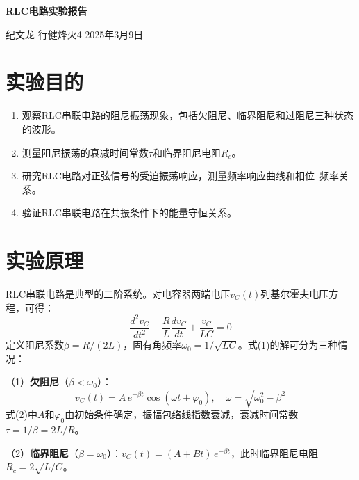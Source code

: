 \documentclass[12pt, a4paper]{article}
\begin{document}
\begin{center}
{\LARGE \textbf{RLC电路实验报告}}
\end{center}

\begin{flushright}
纪文龙 \quad 行健烽火4  \quad 2025年3月9日
\end{flushright}

\vspace{0.5cm}

\section*{实验目的}

\begin{enumerate}[label=\arabic*、]
    \item 观察RLC串联电路的阻尼振荡现象，包括欠阻尼、临界阻尼和过阻尼三种状态的波形。
    \item 测量阻尼振荡的衰减时间常数$\tau$和临界阻尼电阻$R_c$。
    \item 研究RLC电路对正弦信号的受迫振荡响应，测量频率响应曲线和相位--频率关系。
    \item 验证RLC串联电路在共振条件下的能量守恒关系。
\end{enumerate}

\section*{实验原理}

RLC串联电路是典型的二阶系统。对电容器两端电压$v_C(t)$列基尔霍夫电压方程，可得：
\begin{equation}
    \frac{d^2 v_C}{dt^2} + \frac{R}{L}\frac{dv_C}{dt} + \frac{v_C}{LC} = 0
\end{equation}
定义阻尼系数$\beta = R/(2L)$，固有角频率$\omega_0 = 1/\sqrt{LC}$。式(1)的解可分为三种情况：

（1）\textbf{欠阻尼}（$\beta < \omega_0$）：
\begin{equation}
    v_C(t) = A\,e^{-\beta t}\cos(\omega t + \varphi_0), \quad \omega = \sqrt{\omega_0^2 - \beta^2}
\end{equation}
式(2)中$A$和$\varphi_0$由初始条件确定，振幅包络线指数衰减，衰减时间常数$\tau = 1/\beta = 2L/R$。

（2）\textbf{临界阻尼}（$\beta = \omega_0$）：$v_C(t) = (A + Bt)\,e^{-\beta t}$，此时临界阻尼电阻$R_c = 2\sqrt{L/C}$。
\end{document}

